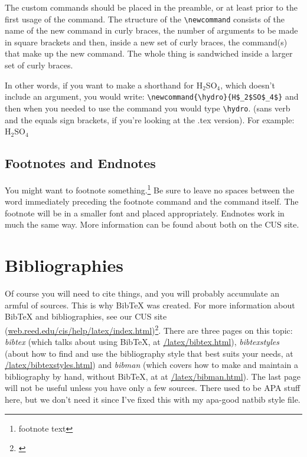 \documentclass[12pt,twoside]{reedthesis}
\begin{document}
The custom commands should be placed in the preamble, or at least prior to the first usage of the command. The structure of the \verb=\newcommand= consists of the name of the new command in curly braces, the number of arguments to be made in square brackets and then, inside a new set of curly braces, the command(s) that make up the new command. The whole thing is sandwiched inside a larger set of curly braces. 

\newcommand{\hydro}{H$_2$SO$_4$}

In other words, if you want to make a shorthand for H$_2$SO$_4$, which doesn't include an argument, you would write: \verb=\newcommand{\hydro}{H$_2$SO$_4$}= and then when you needed  to use the command you would type \verb=\hydro=. (sans verb and the equals sign brackets, if you're looking at the .tex version). For example: \hydro

\subsection{Footnotes and Endnotes}
	You might want to footnote something.\footnote{footnote text} Be sure to leave no spaces between the word immediately preceding the footnote command and the command itself. The footnote will be in a smaller font and placed appropriately. Endnotes work in much the same way. More information can be found about both on the CUS site.
	
\section{Bibliographies}
	Of course you will need to cite things, and you will probably accumulate an armful of sources. This is why BibTeX was created. For more information about BibTeX and bibliographies, see our CUS site (\url{web.reed.edu/cis/help/latex/index.html})\footnote{\cite{reedweb:2007}}. There are three pages on this topic: {\it bibtex} (which talks about using BibTeX, at \url{/latex/bibtex.html}), {\it bibtexstyles} (about how to find and use the bibliography style that best suits your needs, at \url{/latex/bibtexstyles.html}) and {\it bibman} (which covers how to make and maintain a bibliography by hand, without BibTeX, at at \url{/latex/bibman.html}). The last page will not be useful unless you have only a few sources. There used to be APA stuff here, but we don't need it since I've fixed this with my apa-good natbib style file.
	
\end{document}
